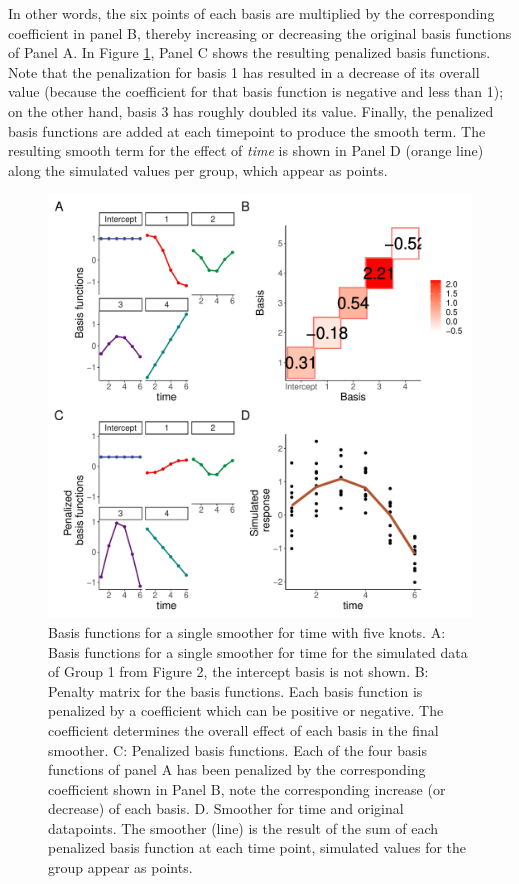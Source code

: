\documentclass[
]{article}
\begin{document}
In other words, the six points of each basis are multiplied by the corresponding coefficient in panel B, thereby increasing or decreasing the original basis functions of Panel A. In Figure \ref{fig:basis-plot}, Panel C shows the resulting penalized basis functions. Note that the penalization for basis 1 has resulted in a decrease of its overall value (because the coefficient for that basis function is negative and less than 1); on the other hand, basis 3 has roughly doubled its value. Finally, the penalized basis functions are added at each timepoint to produce the smooth term. The resulting smooth term for the effect of \emph{time} is shown in Panel D (orange line) along the simulated values per group, which appear as points.

\begin{figure}[!h]

{\centering \includegraphics[width=0.75\linewidth,]{Manuscript_AM_v5_files/figure-latex/basis-plot-1} 

}

\caption{Basis functions for a single smoother for time with five knots. A: Basis functions for a single smoother for time for the simulated data of Group 1 from Figure 2, the intercept basis is not shown. B: Penalty matrix for the basis functions. Each basis function is penalized by a coefficient which can be positive or negative. The coefficient determines the overall effect of each basis in the final smoother. C: Penalized basis functions. Each of the four basis functions of panel A has been penalized by the corresponding coefficient shown in Panel B, note the corresponding increase (or decrease) of each basis. D. Smoother for time and original datapoints. The smoother (line) is the result of the sum of each penalized basis function at each time point, simulated values for the group appear as points.}\label{fig:basis-plot}
\end{figure}
\end{document}

